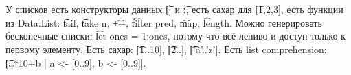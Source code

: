 \section{} %
У списков есть конструкторы данных \t{[]} и \t{:}, есть сахар для \t{[1,2,3]},
есть функции из Data.List: \t{tail}, \t{take n}, \t{++}, \t{filter pred}, \t{map},
\t{length}.
Можно генерировать бесконечные списки: \t{let ones = 1:ones}, потому что всё лениво
и доступ только к первому элементу.
Есть сахар: \t{[1..10]}, \t{[2..]}, \t{['a'..'z']}.
Есть list comprehension: \t{[a*10+b | a <- [0..9], b <- [0..9]]}.

\section{} %

\section{} %

\section{} %

\section{} %
